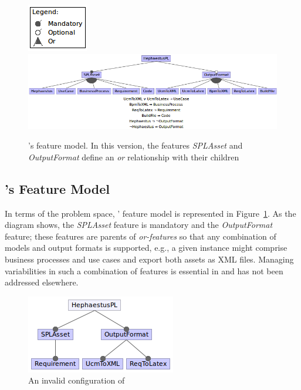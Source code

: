 \begin{figure}[bth]
\begin{center}
\includegraphics[width=.2\textwidth]{imagens/fm-hpl2.png}
\includegraphics[width=\textwidth]{imagens/fm-hpl1.png}
\end{center}
\caption{\hpl's feature model. In this version, the features \textit{SPLAsset} and \textit{OutputFormat} define an \emph{or} relationship with their children}
\label{fig:hephaestus-fm-03}
\end{figure}


\subsection{\hpl's Feature Model} 
\label{feature-model-hpl}

In terms of the problem space, \hpl' feature model is represented in Figure~\ref{fig:hephaestus-fm-03}. As the diagram shows, the \emph{SPLAsset} feature is mandatory and the \emph{OutputFormat} feature; these features are parents of \emph{or-features} so that any combination of models and output formats is supported, e.g., a given instance might comprise business processes and use cases and export both assets as XML files. Managing variabilities in such a combination of features is essential in \hpl{} and has not been addressed elsewhere.


\begin{figure}[htb]
\begin{center}
\includegraphics[scale=0.6]{imagens/confInvalid.png}
\end{center}
\caption{An invalid configuration of \hpl}
\label{fig:hephaestus-conf-invalid}
\end{figure}

